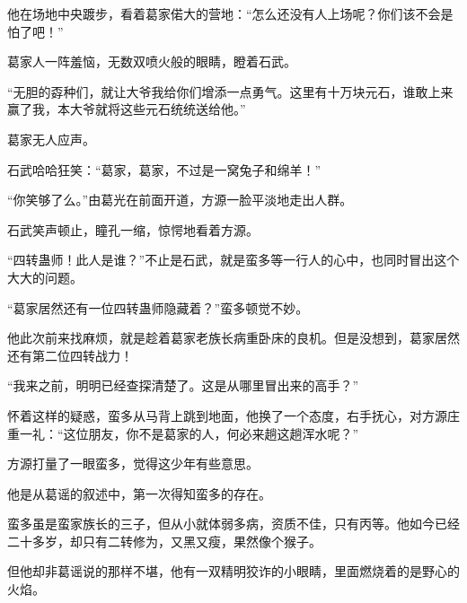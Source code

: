\begin{this_body}
他在场地中央踱步，看着葛家偌大的营地：“怎么还没有人上场呢？你们该不会是怕了吧！”

葛家人一阵羞恼，无数双喷火般的眼睛，瞪着石武。

“无胆的孬种们，就让大爷我给你们增添一点勇气。这里有十万块元石，谁敢上来赢了我，本大爷就将这些元石统统送给他。”

葛家无人应声。

石武哈哈狂笑：“葛家，葛家，不过是一窝兔子和绵羊！”

“你笑够了么。”由葛光在前面开道，方源一脸平淡地走出人群。

石武笑声顿止，瞳孔一缩，惊愕地看着方源。

“四转蛊师！此人是谁？”不止是石武，就是蛮多等一行人的心中，也同时冒出这个大大的问题。

“葛家居然还有一位四转蛊师隐藏着？”蛮多顿觉不妙。

他此次前来找麻烦，就是趁着葛家老族长病重卧床的良机。但是没想到，葛家居然还有第二位四转战力！

“我来之前，明明已经查探清楚了。这是从哪里冒出来的高手？”

怀着这样的疑惑，蛮多从马背上跳到地面，他换了一个态度，右手抚心，对方源庄重一礼：“这位朋友，你不是葛家的人，何必来趟这趟浑水呢？”

方源打量了一眼蛮多，觉得这少年有些意思。

他是从葛谣的叙述中，第一次得知蛮多的存在。

蛮多虽是蛮家族长的三子，但从小就体弱多病，资质不佳，只有丙等。他如今已经二十多岁，却只有二转修为，又黑又瘦，果然像个猴子。

但他却非葛谣说的那样不堪，他有一双精明狡诈的小眼睛，里面燃烧着的是野心的火焰。

\end{this_body}

